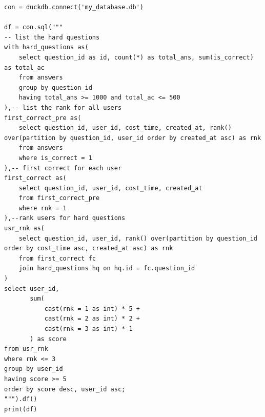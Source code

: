 \documentclass[12pt,a4paper]{article}
\begin{document}
\begin{enumerate}
\begin{enumerate}
\begin{verbatim}
con = duckdb.connect('my_database.db')

df = con.sql("""
-- list the hard questions
with hard_questions as(
    select question_id as id, count(*) as total_ans, sum(is_correct) as total_ac
    from answers
    group by question_id
    having total_ans >= 1000 and total_ac <= 500
),-- list the rank for all users
first_correct_pre as(
    select question_id, user_id, cost_time, created_at, rank() over(partition by question_id, user_id order by created_at asc) as rnk
    from answers
    where is_correct = 1
),-- first correct for each user
first_correct as(
    select question_id, user_id, cost_time, created_at
    from first_correct_pre
    where rnk = 1
),--rank users for hard questions
usr_rnk as(
    select question_id, user_id, rank() over(partition by question_id order by cost_time asc, created_at asc) as rnk
    from first_correct fc
    join hard_questions hq on hq.id = fc.question_id
)
select user_id, 
       sum(
           cast(rnk = 1 as int) * 5 +
           cast(rnk = 2 as int) * 2 +
           cast(rnk = 3 as int) * 1
       ) as score
from usr_rnk
where rnk <= 3
group by user_id
having score >= 5
order by score desc, user_id asc;
""").df()
print(df)


\end{verbatim}
\end{enumerate}
\end{enumerate}
\end{document}
